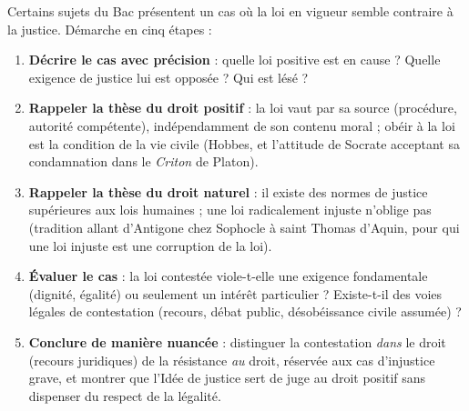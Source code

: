 \documentclass[11pt]{article}
\begin{document}
\begin{methode}
Certains sujets du Bac présentent un cas où la loi en vigueur semble contraire à la justice. Démarche en cinq étapes :
\begin{enumerate}
\item \textbf{Décrire le cas avec précision} : quelle loi positive est en cause ? Quelle exigence de justice lui est opposée ? Qui est lésé ?
\item \textbf{Rappeler la thèse du droit positif} : la loi vaut par sa source (procédure, autorité compétente), indépendamment de son contenu moral ; obéir à la loi est la condition de la vie civile (Hobbes, et l'attitude de Socrate acceptant sa condamnation dans le \emph{Criton} de Platon).
\item \textbf{Rappeler la thèse du droit naturel} : il existe des normes de justice supérieures aux lois humaines ; une loi radicalement injuste n'oblige pas (tradition allant d'Antigone chez Sophocle à saint Thomas d'Aquin, pour qui une loi injuste est une corruption de la loi).
\item \textbf{Évaluer le cas} : la loi contestée viole-t-elle une exigence fondamentale (dignité, égalité) ou seulement un intérêt particulier ? Existe-t-il des voies légales de contestation (recours, débat public, désobéissance civile assumée) ?
\item \textbf{Conclure de manière nuancée} : distinguer la contestation \emph{dans} le droit (recours juridiques) de la résistance \emph{au} droit, réservée aux cas d'injustice grave, et montrer que l'Idée de justice sert de juge au droit positif sans dispenser du respect de la légalité.
\end{enumerate}
\end{methode}
\end{document}
